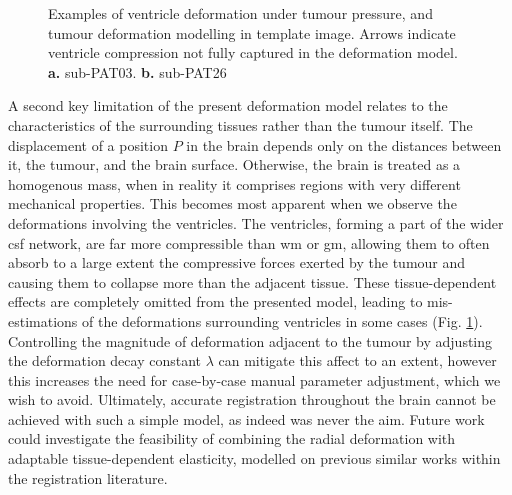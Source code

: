 \begin{figure}[htb!]
  
  \caption[Ventricle deformation examples]{Examples of ventricle deformation under tumour pressure, and tumour deformation modelling in template image. Arrows indicate ventricle compression not fully captured in the deformation model. \textbf{\sffamily a.}  sub-PAT03. \textbf{\sffamily b.}  sub-PAT26}
  \label{fig:ventricles}
\end{figure}

A second key limitation of the present deformation model relates to the characteristics of the surrounding tissues rather than the tumour itself.
The displacement of a position $P$ in the brain depends only on the distances between it, the tumour, and the brain surface.
Otherwise, the brain is treated as a homogenous mass, when in reality it comprises regions with very different mechanical properties.
This becomes most apparent when we observe the deformations involving the ventricles.
The ventricles, forming a part of the wider \gls{csf} network, are far more compressible than \gls{wm} or \gls{gm}, allowing them to often absorb to a large extent the compressive forces exerted by the tumour and causing them to collapse more than the adjacent tissue.
These tissue-dependent effects are completely omitted from the presented model, leading to mis-estimations of the deformations surrounding ventricles in some cases (Fig. \ref{fig:ventricles}).
Controlling the magnitude of deformation adjacent to the tumour by adjusting the deformation decay constant $\lambda$ can mitigate this affect to an extent, however this increases the need for case-by-case manual parameter adjustment, which we wish to avoid.
Ultimately, accurate registration throughout the brain cannot be achieved with such a simple model, as indeed was never the aim.
Future work could investigate the feasibility of combining the radial deformation with adaptable tissue-dependent elasticity, modelled on previous similar works within the registration literature\autocite{Rohde2003,Duay2004}.
